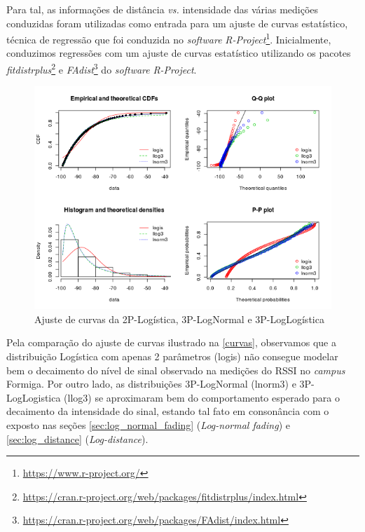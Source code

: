 \documentclass[
	12pt,				%
	twoside,			%
	a4paper,			%
	english,			%
	french,				%
	spanish,			%
	brazil				%
	]{abntex2}
\begin{document}
Para tal, as informações de distância \emph{vs.} intensidade das várias
medições conduzidas foram utilizadas como entrada para um ajuste de
curvas estatístico, técnica de regressão que foi conduzida no
\emph{software} \emph{R-Project}\footnote{\url{https://www.r-project.org/}}.
Inicialmente, conduzimos regressões com um ajuste de curvas estatístico
utilizando os pacotes \emph{fitdistrplus}\footnote{\url{https://cran.r-project.org/web/packages/fitdistrplus/index.html}}
e \emph{FAdist}\footnote{\url{https://cran.r-project.org/web/packages/FAdist/index.html}}
do \emph{software} \emph{R-Project}.

\begin{figure}[htb]
    \caption{\label{curvas} Ajuste de curvas da 2P-Logística, 3P-LogNormal e 3P-LogLogística}
    \begin{center}
        \includegraphics[scale=0.8]{imagens/curvas.jpg}
    \end{center}
\end{figure}

Pela comparação do ajuste de curvas ilustrado na \autoref{curvas},
observamos que a distribuição Logística com apenas 2 parâmetros (logis)
não consegue modelar bem o decaimento do nível de sinal observado na
medições do RSSI no \emph{campus} Formiga. Por outro lado, as
distribuições 3P-LogNormal (lnorm3) e 3P-LogLogistica (llog3) se
aproximaram bem do comportamento esperado para o decaimento da
intensidade do sinal, estando tal fato em consonância com o exposto nas
seções \ref{sec:log_normal_fading} (\emph{Log-normal fading}) e
\ref{sec:log_distance} (\emph{Log-distance}).
\end{document}
